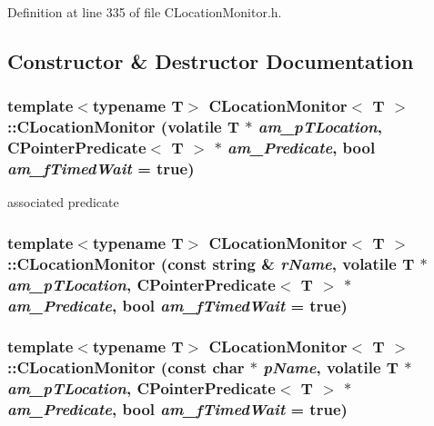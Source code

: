 Definition at line 335 of file CLocation\-Monitor.h.

\subsection{Constructor \& Destructor Documentation}
\subsubsection{\setlength{\rightskip}{0pt plus 5cm}template$<$typename T$>$ CLocation\-Monitor$<$ T $>$::CLocation\-Monitor (volatile T $\ast$ {\em am\_\-p\-TLocation}, {\bf CPointer\-Predicate}$<$ T $>$ $\ast$ {\em am\_\-Predicate}, bool {\em am\_\-f\-Timed\-Wait} = true)\hspace{0.3cm}{\tt  [inline]}}\label{classCLocationMonitor_a0}


associated predicate 
\subsubsection{\setlength{\rightskip}{0pt plus 5cm}template$<$typename T$>$ CLocation\-Monitor$<$ T $>$::CLocation\-Monitor (const string \& {\em r\-Name}, volatile T $\ast$ {\em am\_\-p\-TLocation}, {\bf CPointer\-Predicate}$<$ T $>$ $\ast$ {\em am\_\-Predicate}, bool {\em am\_\-f\-Timed\-Wait} = true)\hspace{0.3cm}{\tt  [inline]}}\label{classCLocationMonitor_a1}


\subsubsection{\setlength{\rightskip}{0pt plus 5cm}template$<$typename T$>$ CLocation\-Monitor$<$ T $>$::CLocation\-Monitor (const char $\ast$ {\em p\-Name}, volatile T $\ast$ {\em am\_\-p\-TLocation}, {\bf CPointer\-Predicate}$<$ T $>$ $\ast$ {\em am\_\-Predicate}, bool {\em am\_\-f\-Timed\-Wait} = true)\hspace{0.3cm}{\tt  [inline]}}\label{classCLocationMonitor_a2}


